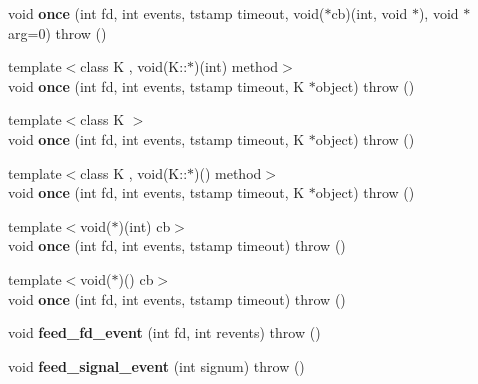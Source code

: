 \begin{DoxyCompactItemize}
\item 
\hypertarget{structev_1_1loop__ref_a15e082bc546385d1c465c46ec2f5e57c}{}\label{structev_1_1loop__ref_a15e082bc546385d1c465c46ec2f5e57c} 
void {\bfseries once} (int fd, int events, tstamp timeout, void($\ast$cb)(int, void $\ast$), void $\ast$arg=0)  throw ()
\item 
\hypertarget{structev_1_1loop__ref_a00791486a12936d4bc98cf060b2a87ae}{}\label{structev_1_1loop__ref_a00791486a12936d4bc98cf060b2a87ae} 
{\footnotesize template$<$class K , void(\+K\+::$\ast$)(int) method$>$ }\\void {\bfseries once} (int fd, int events, tstamp timeout, K $\ast$object)  throw ()
\item 
\hypertarget{structev_1_1loop__ref_a05d8ecf4b8df5de8ef2742eec6eee7b4}{}\label{structev_1_1loop__ref_a05d8ecf4b8df5de8ef2742eec6eee7b4} 
{\footnotesize template$<$class K $>$ }\\void {\bfseries once} (int fd, int events, tstamp timeout, K $\ast$object)  throw ()
\item 
\hypertarget{structev_1_1loop__ref_a00791486a12936d4bc98cf060b2a87ae}{}\label{structev_1_1loop__ref_a00791486a12936d4bc98cf060b2a87ae} 
{\footnotesize template$<$class K , void(\+K\+::$\ast$)() method$>$ }\\void {\bfseries once} (int fd, int events, tstamp timeout, K $\ast$object)  throw ()
\item 
\hypertarget{structev_1_1loop__ref_ad00f4c273e5c2531392ef3909992b888}{}\label{structev_1_1loop__ref_ad00f4c273e5c2531392ef3909992b888} 
{\footnotesize template$<$void($\ast$)(int) cb$>$ }\\void {\bfseries once} (int fd, int events, tstamp timeout)  throw ()
\item 
\hypertarget{structev_1_1loop__ref_ad00f4c273e5c2531392ef3909992b888}{}\label{structev_1_1loop__ref_ad00f4c273e5c2531392ef3909992b888} 
{\footnotesize template$<$void($\ast$)() cb$>$ }\\void {\bfseries once} (int fd, int events, tstamp timeout)  throw ()
\item 
\hypertarget{structev_1_1loop__ref_ab9ee42bfaba2b1e86f797bc6dfbfd0dc}{}\label{structev_1_1loop__ref_ab9ee42bfaba2b1e86f797bc6dfbfd0dc} 
void {\bfseries feed\+\_\+fd\+\_\+event} (int fd, int revents)  throw ()
\item 
\hypertarget{structev_1_1loop__ref_ad398231ff9498cfa17bad40baf3ce928}{}\label{structev_1_1loop__ref_ad398231ff9498cfa17bad40baf3ce928} 
void {\bfseries feed\+\_\+signal\+\_\+event} (int signum)  throw ()
\end{DoxyCompactItemize}
